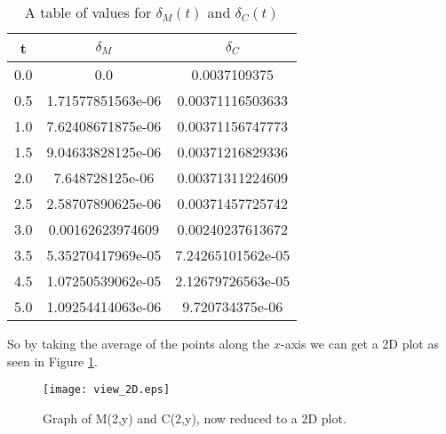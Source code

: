    \begin{table}
    \begin{center}
      \begin{tabular}{| c | c | c |} 
        \hline
        t & $\delta_M$ & $\delta_C$ \\
        \hline
        0.0 & 0.0 & 0.0037109375 \\
        0.5 &1.71577851563e-06 & 0.00371116503633\\
        1.0 &7.62408671875e-06 & 0.00371156747773\\
        1.5 &9.04633828125e-06 & 0.00371216829336\\
        2.0 &7.648728125e-06 & 0.00371311224609\\
        2.5 &2.58707890625e-06 & 0.00371457725742\\
        3.0 &0.00162623974609 & 0.00240237613672\\
        3.5 &5.35270417969e-05 & 7.24265101562e-05\\
        4.5 &1.07250539062e-05 & 2.12679726563e-05 \\
        5.0 &1.09254414063e-06 & 9.720734375e-06\\
        \hline
      \end{tabular}
      \caption{A table of values for $\delta_M(t)$ and $\delta_C(t)$}
      \label{tab:overTime}
    \end{center}
  \end{table}
   
   So by taking the average of the points along the $x$-axis we can get a 2D plot as seen in Figure \ref{fig:true2D}. 
   
 
   
 
    
  \begin{figure}[h!bt]
    \begin{center}
        \texttt{[image: view\_2D.eps]}
      \caption{Graph of M(2,y) and C(2,y), now reduced to a 2D plot.}
      \label{fig:true2D}
    \end{center}
  \end{figure}






